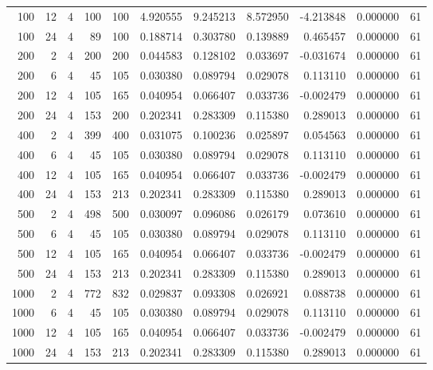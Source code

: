 \begin{table}
\begin{tabular}{rrrrrrrrrrr}
100 & 12 & 4 & 100 & 100 & 4.920555 & 9.245213 & 8.572950 & -4.213848 & 0.000000 & 61 \\
100 & 24 & 4 & 89 & 100 & 0.188714 & 0.303780 & 0.139889 & 0.465457 & 0.000000 & 61 \\
200 & 2 & 4 & 200 & 200 & 0.044583 & 0.128102 & 0.033697 & -0.031674 & 0.000000 & 61 \\
200 & 6 & 4 & 45 & 105 & 0.030380 & 0.089794 & 0.029078 & 0.113110 & 0.000000 & 61 \\
200 & 12 & 4 & 105 & 165 & 0.040954 & 0.066407 & 0.033736 & -0.002479 & 0.000000 & 61 \\
200 & 24 & 4 & 153 & 200 & 0.202341 & 0.283309 & 0.115380 & 0.289013 & 0.000000 & 61 \\
400 & 2 & 4 & 399 & 400 & 0.031075 & 0.100236 & 0.025897 & 0.054563 & 0.000000 & 61 \\
400 & 6 & 4 & 45 & 105 & 0.030380 & 0.089794 & 0.029078 & 0.113110 & 0.000000 & 61 \\
400 & 12 & 4 & 105 & 165 & 0.040954 & 0.066407 & 0.033736 & -0.002479 & 0.000000 & 61 \\
400 & 24 & 4 & 153 & 213 & 0.202341 & 0.283309 & 0.115380 & 0.289013 & 0.000000 & 61 \\
500 & 2 & 4 & 498 & 500 & 0.030097 & 0.096086 & 0.026179 & 0.073610 & 0.000000 & 61 \\
500 & 6 & 4 & 45 & 105 & 0.030380 & 0.089794 & 0.029078 & 0.113110 & 0.000000 & 61 \\
500 & 12 & 4 & 105 & 165 & 0.040954 & 0.066407 & 0.033736 & -0.002479 & 0.000000 & 61 \\
500 & 24 & 4 & 153 & 213 & 0.202341 & 0.283309 & 0.115380 & 0.289013 & 0.000000 & 61 \\
1000 & 2 & 4 & 772 & 832 & 0.029837 & 0.093308 & 0.026921 & 0.088738 & 0.000000 & 61 \\
1000 & 6 & 4 & 45 & 105 & 0.030380 & 0.089794 & 0.029078 & 0.113110 & 0.000000 & 61 \\
1000 & 12 & 4 & 105 & 165 & 0.040954 & 0.066407 & 0.033736 & -0.002479 & 0.000000 & 61 \\
1000 & 24 & 4 & 153 & 213 & 0.202341 & 0.283309 & 0.115380 & 0.289013 & 0.000000 & 61 \\
\bottomrule
\end{tabular}
\end{table}

